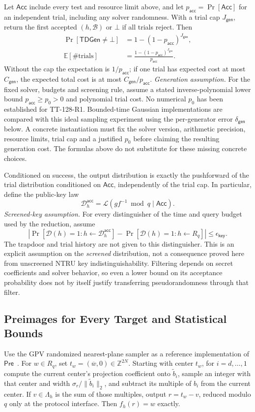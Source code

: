 \documentclass[lettersize,journal]{IEEEtran}
\begin{document}
	Let $\mathsf{Acc}$ include every test and resource limit above, and let
	$p_{\mathsf{acc}}=\Pr[\mathsf{Acc}]$ for an independent trial, including
	any solver randomness. With a trial cap $J_{\mathsf{gen}}$, return the
	first accepted $(h,\mathcal B)$ or $\bot$ if all trials reject. Then
	\[
	\begin{aligned}
		\Pr[\mathsf{TDGen}\ne\bot]
		&=1-(1-p_{\mathsf{acc}})^{J_{\mathsf{gen}}},\\
		\mathbb E[\#\text{trials}]
		&=\frac{1-(1-p_{\mathsf{acc}})^{J_{\mathsf{gen}}}}
		{p_{\mathsf{acc}}}.
	\end{aligned}
	\]
	Without the cap the expectation is $1/p_{\mathsf{acc}}$; if one trial
	has expected cost at most $C_{\mathsf{gen}}$, the expected total cost
	is at most $C_{\mathsf{gen}}/p_{\mathsf{acc}}$.
	\emph{Generation assumption.} For the fixed solver, budgets and
	screening rule, assume a stated inverse-polynomial lower bound
	$p_{\mathsf{acc}}\geq p_0>0$ and polynomial trial cost. No numerical
	$p_0$ has been established for TT-128-R1. Bounded-time Gaussian
	implementations are compared with this ideal sampling experiment using
	the per-generator error $\delta_{\mathsf{gen}}$ below.
	A concrete instantiation must fix the solver version, arithmetic
	precision, resource limits, trial cap and a justified $p_0$ before
	claiming the resulting generation cost. The formulas above do not
	substitute for these missing concrete choices.
	
	Conditioned on success, the output distribution is exactly the pushforward
	of the trial distribution conditioned on $\mathsf{Acc}$, independently
	of the trial cap. In particular, define the public-key law
	\[
	\mathcal D_h^{\mathsf{acc}}
	=\mathcal L(gf^{-1}\bmod q\mid\mathsf{Acc}).
	\]
	\emph{Screened-key assumption.} For every distinguisher of the time and
	query budget used by the reduction, assume
	\[
	\left|\Pr[\mathcal D(h)=1:h\leftarrow\mathcal D_h^{\mathsf{acc}}]
	-\Pr[\mathcal D(h)=1:h\leftarrow R_q]\right|
	\leq\epsilon_{\mathsf{key}}.
	\]
	The trapdoor and trial history are not given to this distinguisher.
	This is an explicit assumption on the \emph{screened} distribution,
	not a consequence proved here from unscreened NTRU key indistinguishability.
	Filtering depends on secret coefficients and solver behavior, so even a
	lower bound on its acceptance probability does not by itself justify
	transferring pseudorandomness through that filter.
	
	\subsection{Preimages for Every Target and Statistical Bounds}
	\label{par:blue-preimage-contract}
	Use the GPV randomized nearest-plane sampler as a reference
	implementation of $\mathsf{Pre}$~\cite{GPV08}.
	For $w\in R_q$, set $t_w=(\overline w,0)\in\mathbb Z^{2N}$.
	Starting with center $t_w$, for $i=d,\ldots,1$ compute the current
	center's projection coefficient onto $\widetilde b_i$, sample an integer
	with that center and width $\sigma_r/\|\widetilde b_i\|_2$, and subtract
	its multiple of $b_i$ from the current center. If $v\in\Lambda_h$ is
	the sum of those multiples, output $r=t_w-v$, reduced modulo $q$ only
	at the protocol interface. Then $f_h(r)=w$ exactly.
	
\end{document}
